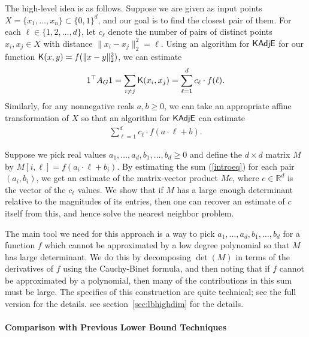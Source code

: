 The high-level idea is as follows. Suppose we are given as input points $X = \{ x_1, \ldots, x_n\} \subset \{0,1\}^d$, and our goal is to find the closest pair of them. For each $\ell \in \{1,2,\ldots,d\}$, let $c_\ell$ denote the number of pairs of distinct points $x_i, x_j \in X$ with distance $\|x_i - x_j\|_2^2 = \ell$. Using an algorithm for $\mathsf{KAdjE}$ for our function $\mathsf{K}(x,y) = f(\| x-y \|_2^2)$, we can estimate
$$1^\top A_G 1 = \sum_{i \neq j} \mathsf{K}(x_i, x_j) = \sum_{\ell=1}^d c_\ell \cdot f(\ell).$$
Similarly, for any nonnegative reals $a,b \geq 0$, we can take an appropriate affine transformation of $X$ so that an algorithm for $\mathsf{KAdjE}$ can estimate
\begin{align}\label{introeq}\sum_{\ell=1}^d c_\ell \cdot f(a\cdot \ell + b).\end{align}

Suppose we pick real values $a_1, \ldots,a_d,b_1,\ldots,b_d \geq 0$ and define the $d \times d$ matrix $M$ by $M[i,\ell] = f(a_i \cdot \ell + b_i)$. By estimating the sum (\ref{introeq}) for each pair $(a_i,b_i)$, we get an estimate of the matrix-vector product $Mc$, where $c \in \mathbb{R}^d$ is the vector of the $c_\ell$ values. We show that if $M$ has a large enough determinant relative to the magnitudes of its entries, then one can recover an estimate of $c$ itself from this, and hence solve the nearest neighbor problem. 

The main tool we need for this approach is a way to pick $a_1, \ldots,a_d,b_1,\ldots,b_d$ for a function $f$ which cannot be approximated by a low degree polynomial so that $M$ has large determinant. We do this by decomposing $\det(M)$ in terms of the derivatives of $f$ using the Cauchy-Binet formula, and then noting that if $f$ cannot be approximated by a polynomial, then many of the contributions in this sum must be large. The specifics of this construction are quite technical; 
\ifdefined\isfocs
see the full version for the details.
\else
see section~\ref{sec:lbhighdim} for the details.
\fi



\paragraph*{Comparison with Previous Lower Bound Techniques}


